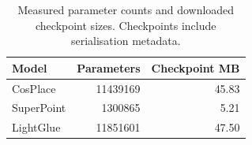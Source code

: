 \begin{table}[htbp]\centering\small
\caption{Measured parameter counts and downloaded checkpoint sizes. Checkpoints include serialisation metadata.}\label{tab:models}
\begin{tabular}{lrr}
\toprule
Model & Parameters & Checkpoint MB \\
\midrule
CosPlace & 11439169 & 45.83 \\
SuperPoint & 1300865 & 5.21 \\
LightGlue & 11851601 & 47.50 \\
\bottomrule
\end{tabular}\end{table}
